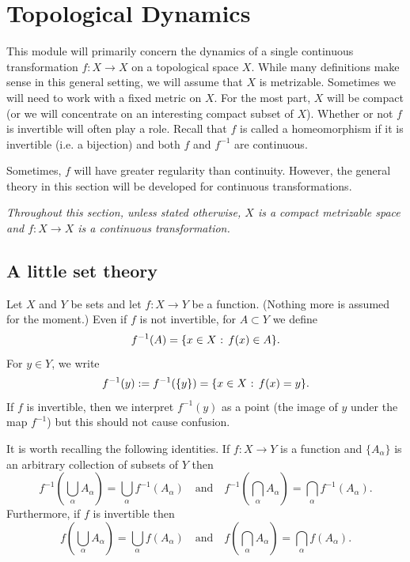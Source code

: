 \documentclass[12pt]{article}
\theoremstyle{definition}
\theoremstyle{remark}
\begin{document}
\newpage

\section{Topological Dynamics}

This module will primarily concern the dynamics of a single continuous transformation 
$f : X \to X$ on a topological space
$X$. 
While many definitions make sense in this general setting, we will assume that
$X$ is metrizable. Sometimes we will need to work with a fixed metric on $X$.
For the most part, $X$ will be compact (or we will concentrate on an interesting compact subset of $X$).
Whether or not $f$ is invertible will often play a role. Recall that $f$ is called a homeomorphism if 
it is invertible (i.e. a bijection) and
both $f$ and $f^{-1}$ are continuous. 


Sometimes, $f$ will have greater regularity than continuity. However, 
the general theory in this section will be developed for continuous transformations.

{\it Throughout this section, unless stated otherwise, $X$ is a compact metrizable space 
and $f : X \to X$ is a continuous
transformation.}

\subsection{A little set theory}

Let $X$ and $Y$ be sets and let $f : X \to Y$ be a function. (Nothing more is assumed for the moment.)
Even if $f$ is not invertible, for $A \subset Y$ we define
\[
f^{-1}(A) = \{x \in X \hbox{ : } f(x) \in A\}.
\]
For $y \in Y$, we write
\[
f^{-1}(y) := f^{-1}(\{y\}) =\{x \in X \hbox{ : } f(x)=y\}.
\]
If $f$ is invertible, then we interpret $f^{-1}(y)$ as a point (the image of $y$ under the map $f^{-1}$)
but this should not cause confusion.

It is worth recalling the following identities.
If $f : X \to Y$ is a function and $\{A_\alpha\}$ is an arbitrary collection of subsets of $Y$
then
\[
f^{-1}\left(\bigcup_\alpha A_\alpha\right) 
= \bigcup_\alpha f^{-1}(A_\alpha)
\quad \text{and} \quad
f^{-1}\left(\bigcap_\alpha A_\alpha\right) 
= \bigcap_\alpha f^{-1}(A_\alpha).
\]
Furthermore, if $f$ is invertible then 
\[
f\left(\bigcup_\alpha A_\alpha\right) 
= \bigcup_\alpha f(A_\alpha)
\quad \text{and} \quad
f\left(\bigcap_\alpha A_\alpha\right) 
= \bigcap_\alpha f(A_\alpha).
\]
\end{document}
